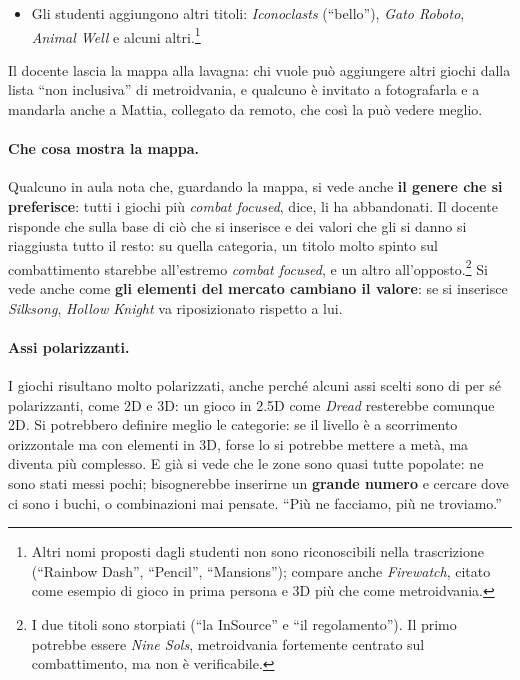 \begin{itemize}
{        dopo con un nome a sé (``Oderamma''); il riferimento resta quindi
        incerto.} Questi titoli avrebbero probabilmente una challenge più
        bassa degli altri: il primo \emph{Metroid} sta in un punto, e
        \emph{Metroid: Other M} in un altro, forse più in là.
  \item Gli studenti aggiungono altri titoli: \emph{Iconoclasts} (``bello''),
        \emph{Gato Roboto}, \emph{Animal Well} e alcuni altri.\footnote{Altri
        nomi proposti dagli studenti non sono riconoscibili nella
        trascrizione (``Rainbow Dash'', ``Pencil'', ``Mansions''); compare
        anche \emph{Firewatch}, citato come esempio di gioco in prima persona
        e 3D più che come metroidvania.}
\end{itemize}
Il docente lascia la mappa alla lavagna: chi vuole può aggiungere altri
giochi dalla lista ``non inclusiva'' di metroidvania, e qualcuno è invitato a
fotografarla e a mandarla anche a Mattia, collegato da remoto, che così la
può vedere meglio.

\paragraph{Che cosa mostra la mappa.} Qualcuno in aula nota che, guardando
la mappa, si vede anche \textbf{il genere che si preferisce}: tutti i giochi
più \emph{combat focused}, dice, li ha abbandonati. Il docente risponde che sulla
base di ciò che si inserisce e dei valori che gli si danno si riaggiusta
tutto il resto: su quella categoria, un titolo molto spinto sul combattimento
starebbe all'estremo \emph{combat focused}, e un altro
all'opposto.\footnote{I due titoli sono storpiati (``la InSource'' e ``il
regolamento''). Il primo potrebbe essere \emph{Nine Sols}, metroidvania
fortemente centrato sul combattimento, ma non è verificabile.}
Si vede anche come \textbf{gli elementi del mercato cambiano il valore}: se si
inserisce \emph{Silksong}, \emph{Hollow Knight} va riposizionato rispetto a
lui.

\paragraph{Assi polarizzanti.} I giochi risultano molto polarizzati, anche
perché alcuni assi scelti sono di per sé polarizzanti, come 2D e 3D: un gioco
in 2.5D come \emph{Dread} resterebbe comunque 2D. Si potrebbero definire
meglio le categorie: se il livello è a scorrimento orizzontale ma con
elementi in 3D, forse lo si potrebbe mettere a metà, ma diventa più
complesso. E già si vede che le zone sono quasi tutte popolate: ne sono stati
messi pochi; bisognerebbe inserirne un \textbf{grande numero} e cercare dove
ci sono i buchi, o combinazioni mai pensate. ``Più ne facciamo, più ne
troviamo.''

